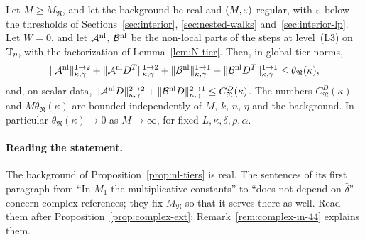 \begin{proposition}
Let $M\ge M_{\mathfrak N}$, and let the background be real and $(M,\varepsilon)$-regular, with $\varepsilon$ below the thresholds of Sections~\ref{sec:interior}, \ref{sec:nested-walks} and~\ref{sec:interior-lp}. Let $W=0$, and let $\mathcal A^{\rm nl}$, $\mathcal B^{\rm nl}$ be the non-local parts of the steps at level~(L3) on $\mathbb T_\eta$, with the factorization of Lemma~\ref{lem:N-tier}. Then, in global tier norms,
\[
\|\mathcal A^{\rm nl}\|^{1\to2}_{\kappa,\gamma}+\|\mathcal A^{\rm nl}D^T\|^{1\to2}_{\kappa,\gamma}+\|\mathcal B^{\rm nl}\|^{1\to1}_{\kappa,\gamma}+\|\mathcal B^{\rm nl}D^T\|^{1\to1}_{\kappa,\gamma}\le\theta_{\mathfrak N}(\kappa),
\]
and, on scalar data, $\|\mathcal A^{\rm nl}D\|^{2\to2}_{\kappa,\gamma}+\|\mathcal B^{\rm nl}D\|^{2\to1}_{\kappa,\gamma}\le C^D_{\mathfrak N}(\kappa)$. The numbers $C^D_{\mathfrak N}(\kappa)$ and $M\theta_{\mathfrak N}(\kappa)$ are bounded independently of $M$, $k$, $n$, $\eta$ and the background. In particular $\theta_{\mathfrak N}(\kappa)\to0$ as $M\to\infty$, for fixed $L,\kappa,\delta,\rho,\alpha$.
\end{proposition}

\paragraph{Reading the statement.} The background of Proposition~\ref{prop:nl-tiers} is real. The sentences of its first paragraph from ``In $M_1$ the multiplicative constants'' to ``does not depend on $\bar\delta$'' concern complex references; they fix $M_{\mathfrak N}$ so that it serves there as well. Read them after Proposition~\ref{prop:complex-ext}; Remark~\ref{rem:complex-in-44} explains them.

